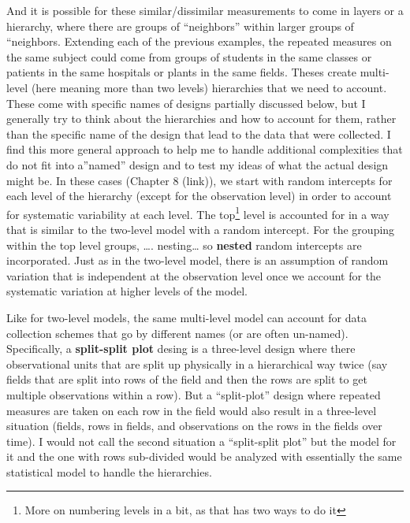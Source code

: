 \documentclass[
]{book}
\begin{document}
\indent And it is possible for these similar/dissimilar measurements to come in layers or a hierarchy, where there are groups of ``neighbors'' within larger groups of ``neighbors. Extending each of the previous examples, the repeated measures on the same subject could come from groups of students in the same classes or patients in the same hospitals or plants in the same fields. Theses create multi-level (here meaning more than two levels) hierarchies that we need to account. These come with specific names of designs partially discussed below, but I generally try to think about the hierarchies and how to account for them, rather than the specific name of the design that lead to the data that were collected. I find this more general approach to help me to handle additional complexities that do not fit into a''named'' design and to test my ideas of what the actual design might be. In these cases (Chapter 8 (link)), we start with random intercepts for each level of the hierarchy (except for the observation level) in order to account for systematic variability at each level. The top\footnote{More on numbering levels in a bit, as that has two ways to do it} level is accounted for in a way that is similar to the two-level model with a random intercept. For the grouping within the top level groups, \ldots. nesting\ldots{} so \textbf{nested} random intercepts are incorporated. Just as in the two-level model, there is an assumption of random variation that is independent at the observation level once we account for the systematic variation at higher levels of the model.

Like for two-level models, the same multi-level model can account for data collection schemes that go by different names (or are often un-named). Specifically, a \textbf{split-split plot} desing is a three-level design where there observational units that are split up physically in a hierarchical way twice (say fields that are split into rows of the field and then the rows are split to get multiple observations within a row). But a ``split-plot'' design where repeated measures are taken on each row in the field would also result in a three-level situation (fields, rows in fields, and observations on the rows in the fields over time). I would not call the second situation a ``split-split plot'' but the model for it and the one with rows sub-divided would be analyzed with essentially the same statistical model to handle the hierarchies.
\end{document}
